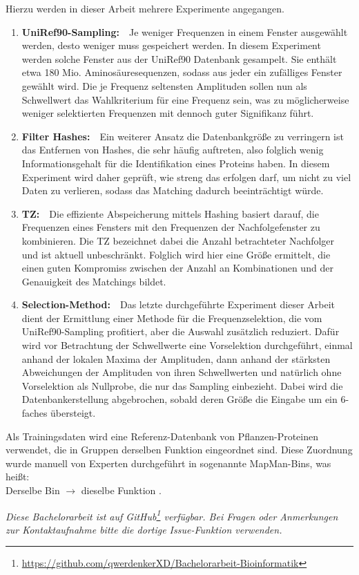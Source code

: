     Hierzu werden in dieser Arbeit mehrere Experimente angegangen.
    \begin{enumerate}
        \item \textbf{UniRef90-Sampling:}\ \ Je weniger Frequenzen in einem Fenster ausgewählt werden, desto weniger muss gespeichert werden. In diesem Experiment werden solche Fenster aus der UniRef90 Datenbank gesampelt. Sie enthält etwa 180 Mio. Aminosäuresequenzen, sodass aus jeder ein zufälliges Fenster gewählt wird. Die je Frequenz seltensten Amplituden sollen nun als Schwellwert das Wahlkriterium für eine Frequenz sein, was zu möglicherweise weniger selektierten Frequenzen mit dennoch guter Signifikanz führt.
        \item \textbf{Filter Hashes:}\ \ Ein weiterer Ansatz die Datenbankgröße zu verringern ist das Entfernen von Hashes, die sehr häufig auftreten, also folglich wenig Informationsgehalt für die Identifikation eines Proteins haben. In diesem Experiment wird daher geprüft, wie streng das erfolgen darf, um nicht zu viel Daten zu verlieren, sodass das Matching dadurch beeinträchtigt würde. 
        \item \textbf{\acl{TZ}:}\ \ Die effiziente Abspeicherung mittels Hashing basiert darauf, die Frequenzen eines Fensters mit den Frequenzen der Nachfolgefenster zu kombinieren. Die \acl{TZ} bezeichnet dabei die Anzahl betrachteter Nachfolger und ist aktuell unbeschränkt. Folglich wird hier eine Größe ermittelt, die einen guten Kompromiss zwischen der Anzahl an Kombinationen und der Genauigkeit des Matchings bildet.
        \item \textbf{Selection-Method:}\ \ Das letzte durchgeführte Experiment dieser Arbeit dient der Ermittlung einer Methode für die Frequenzselektion, die vom UniRef90-Sampling profitiert, aber die Auswahl zusätzlich reduziert. Dafür wird vor Betrachtung der Schwellwerte eine Vorselektion durchgeführt, einmal anhand der lokalen Maxima der Amplituden, dann anhand der stärksten Abweichungen der Amplituden von ihren Schwellwerten und natürlich ohne Vorselektion als Nullprobe, die nur das Sampling einbezieht. Dabei wird die Datenbankerstellung abgebrochen, sobald deren Größe die Eingabe um ein 6-faches übersteigt.
    \end{enumerate}
    Als Trainingsdaten wird eine Referenz-Datenbank von Pflanzen-Proteinen verwendet, die in Gruppen derselben Funktion eingeordnet sind. Diese Zuordnung wurde manuell von Experten durchgeführt in sogenannte MapMan-Bins, was heißt:\\Derselbe Bin $\rightarrow$ dieselbe Funktion \cite{mapman}.

    \textit{Diese Bachelorarbeit ist auf GitHub\footnote{\url{https://github.com/qwerdenkerXD/Bachelorarbeit-Bioinformatik}} verfügbar. Bei Fragen oder Anmerkungen zur Kontaktaufnahme bitte die dortige Issue-Funktion verwenden.}

